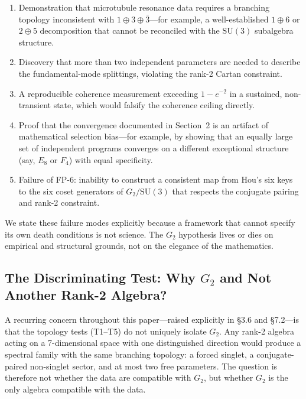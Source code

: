 \documentclass[12pt,a4paper]{article}
\begin{document}
\begin{enumerate}
\item[(a)] Demonstration that microtubule resonance data requires a branching topology inconsistent with $1 \oplus 3 \oplus \bar{3}$---for example, a well-established $1 \oplus 6$ or $2 \oplus 5$ decomposition that cannot be reconciled with the $\mathrm{SU}(3)$ subalgebra structure.

\item[(b)] Discovery that more than two independent parameters are needed to describe the fundamental-mode splittings, violating the rank-2 Cartan constraint.

\item[(c)] A reproducible coherence measurement exceeding $1 - e^{-2}$ in a sustained, non-transient state, which would falsify the coherence ceiling directly.

\item[(d)] Proof that the convergence documented in Section~2 is an artifact of mathematical selection bias---for example, by showing that an equally large set of independent programs converges on a different exceptional structure (say, $E_8$ or $F_4$) with equal specificity.

\item[(e)] Failure of FP-6: inability to construct a consistent map from Hou's six keys to the six coset generators of $G_2/\mathrm{SU}(3)$ that respects the conjugate pairing and rank-2 constraint.
\end{enumerate}

We state these failure modes explicitly because a framework that cannot specify its own death conditions is not science. The $G_2$ hypothesis lives or dies on empirical and structural grounds, not on the elegance of the mathematics.

\subsection{The Discriminating Test: Why $G_2$ and Not Another Rank-2 Algebra?}

A recurring concern throughout this paper---raised explicitly in \S3.6 and \S7.2---is that the topology tests (T1--T5) do not uniquely isolate $G_2$. Any rank-2 algebra acting on a 7-dimensional space with one distinguished direction would produce a spectral family with the same branching topology: a forced singlet, a conjugate-paired non-singlet sector, and at most two free parameters. The question is therefore not whether the data are compatible with $G_2$, but whether $G_2$ is the only algebra compatible with the data.
\end{document}
